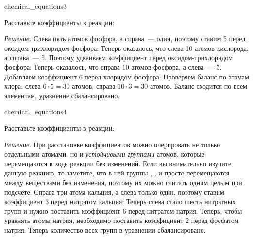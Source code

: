 \begin{example}{}{chemical_equations3}
    \begin{condition}
        Расставьте коэффициенты в реакции:
    \end{condition}

    \medskip

    \textit{Решение.} Слева пять атомов фосфора, а справа~--- один, поэтому ставим 5 перед оксидом-трихлоридом фосфора:
    Теперь оказалось, что слева 10 атомов кислорода, а справа~--- 5. Поэтому удваиваем коэффициент перед оксидом-трихлоридом фосфора:
    Теперь оказалось, что справа 10 атомов фосфора, а слева~--- 5. Добавляем коэффициент 6 перед хлоридом фосфора:
    Проверяем баланс по атомам хлора: слева $6 \cdot 5 = 30$ атомов, справа $10 \cdot 3 = 30$ атомов. Баланс сходится по всем элементам, уравнение сбалансировано.
\end{example}

\begin{example}{}{chemical_equations4}
    \begin{condition}
        Расставьте коэффициенты в реакции:
    \end{condition}

    \medskip

    \textit{Решение.} При расстановке коэффициентов можно оперировать не только отдельными атомами, но и \emph{устойчивыми группами} атомов, которые перемещаются в ходе реакции без изменений. Если вы внимательно изучите данную реакцию, то заметите, что в ней группы , ,  и  просто перемещаются между веществами без изменения, поэтому их можно считать одним целым при подсчёте. Справа три атома кальция, а слева только один, поэтому ставим коэффициент 3 перед нитратом кальция:
    Теперь слева стало шесть нитратных групп  и нужно поставить коэффициент 6 перед нитратом натрия:
    Теперь, чтобы уравнять атомы натрия, необходимо поставить коэффициент 2 перед фосфатом натрия:
    Теперь количество всех групп в уравнении сбалансировано.
\end{example}

